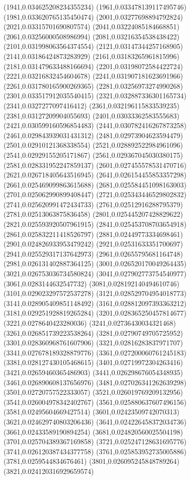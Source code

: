 {(1941,0.034625208234355234)
(1961,0.033478139117495746)
(1981,0.033620765135450474)
(2001,0.03277698894792824)
(2021,0.03315701690807574)
(2041,0.03224085184668851)
(2061,0.03256000508986994)
(2081,0.03216354538438422)
(2101,0.031998063564374554)
(2121,0.03147344257168905)
(2141,0.03186424873283929)
(2161,0.03183265961815996)
(2181,0.031479633488166694)
(2201,0.03198072584422724)
(2221,0.03216832454604678)
(2241,0.031907181623691966)
(2261,0.031780165900269365)
(2281,0.03256973274990268)
(2301,0.033517912035540415)
(2321,0.032887336301165734)
(2341,0.0327277097416412)
(2361,0.032196115833539235)
(2381,0.03127209904055693)
(2401,0.03033362583555683)
(2421,0.030599160596854483)
(2441,0.030782416267873258)
(2461,0.029843939031431312)
(2481,0.02973904623594479)
(2501,0.02910121368338554)
(2521,0.028892522984961096)
(2541,0.02929155205171867)
(2561,0.029367045030380175)
(2581,0.028331952247859137)
(2601,0.027455578531470716)
(2621,0.026718405643516945)
(2641,0.026154455853357298)
(2661,0.025469099863615688)
(2681,0.025584451098163003)
(2701,0.025062990899408447)
(2721,0.025343446529802832)
(2741,0.025620991472434733)
(2761,0.02512916288795379)
(2781,0.02513063875836458)
(2801,0.025445207428829622)
(2821,0.025593920507961915)
(2841,0.025453708703654918)
(2861,0.025832211418526797)
(2881,0.02449773334698461)
(2901,0.024826933953479242)
(2921,0.02531633351700697)
(2941,0.025529317137642973)
(2961,0.02655795681164748)
(2981,0.026131402887364125)
(3001,0.026520170049264435)
(3021,0.026753036734580824)
(3041,0.027902773754540977)
(3061,0.0283144632547732)
(3081,0.028192140494610746)
(3101,0.029023297572537278)
(3121,0.028529704954018773)
(3141,0.028905409851148492)
(3161,0.028812097393363212)
(3181,0.029251928819265284)
(3201,0.028365250457814677)
(3221,0.0278640423280036)
(3241,0.02736430034321468)
(3261,0.026851739223538264)
(3281,0.02790749705725952)
(3301,0.028360968761607906)
(3321,0.02816283837971707)
(3341,0.027678189328879776)
(3361,0.027200060761245183)
(3381,0.028127430105468615)
(3401,0.02719972304263416)
(3421,0.02659460365486903)
(3441,0.026298676054348935)
(3461,0.026890608137656976)
(3481,0.027026341262639298)
(3501,0.02720757522333057)
(3521,0.026019769209132956)
(3541,0.026004978342402767)
(3561,0.025880637607496156)
(3581,0.02495604669427514)
(3601,0.02423509742070313)
(3621,0.024629740803206436)
(3641,0.024226458372034736)
(3661,0.02433589190894254)
(3681,0.024820560025504198)
(3701,0.025704389367169858)
(3721,0.025247128631695776)
(3741,0.026120387434377758)
(3761,0.025853952735005886)
(3781,0.0259544834676461)
(3801,0.026095245848789264)
(3821,0.024120316929659574)
}
